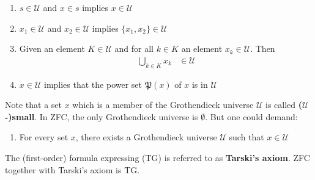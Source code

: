 \begin{enumerate}
\item[(GU1)]
$s \in \mathcal{U}$ and $x \in s$ implies $x \in \mathcal{U}$
\item[(GU2)]
$x_{1} \in \mathcal{U}$ and $x_{2} \in \mathcal{U}$ implies $\lbrace x_{1},x_{2} \rbrace \in \mathcal{U}$
\item[(GU3)]
Given an element $K \in \mathcal{U}$ and for all $k \in K$ an element $x_{k} \in \mathcal{U}$.
Then
\begin{align*}
  \bigcup_{k \in K}
  x_{k}
  &\in
  \mathcal{U}
\end{align*}
\item[(GU4)]
$x \in \mathcal{U}$ implies that the power set $\mathfrak{P}(x)$ of $x$ is in $\mathcal{U}$
\end{enumerate}
Note that a set $x$ which is a member of the Grothendieck universe $\mathcal{U}$ is called \textbf{($\mathcal{U}$-)small}.
In ZFC, the only Grothendieck universe is $\emptyset$.
But one could demand:
\begin{enumerate}
\item[(TG)]
For every set $x$, there exists a Grothendieck universe $\mathcal{U}$ such that $x \in \mathcal{U}$
\end{enumerate}
The (first-order) formula expressing (TG) is referred to as \textbf{Tarski's axiom}.
ZFC together with Tarski's axiom is TG.
